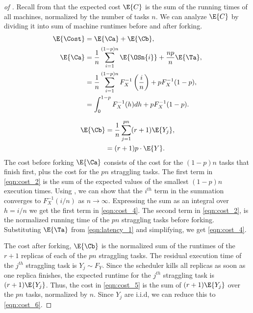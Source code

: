 \begin{proof}[of ]
Recall from  that the expected cost $\E{C}$ is the sum of the running times of all machines, normalized by the number of tasks $n$. We can analyze $\E{C}$ by dividing it into sum of machine runtimes before and after forking.
\begin{align}
    \E{\Cost} &= \E{\Ca} + \E{\Cb} \label{eqn:cost_1} , \\
\E{\Ca} &= \frac{1}{n} \sum_{i=1}^{(1-p) n} \E{\OSn{i}} + \frac{n p}{n} \E{ \Ta} \label{eqn:cost_2},\\
   &= \frac{1}{n} \sum_{i=1}^{(1-p) n} F_X^{-1} \left(\frac{i}{n} \right) + p F_X^{-1}(1-p) \label{eqn:cost_3},\\
   &= \int_{0}^{1-p} F_X^{-1}(h) dh + p F_X^{-1}(1-p) \label{eqn:cost_4}.
\end{align}

\begin{align}
 \E{\Cb} 
  &= \frac{1}{n}  \sum_{j=1}^{pn} (r+1) \E{Y_j} \label{eqn:cost_5},\\
  &= (r+1)  p \cdot \E{Y} . \label{eqn:cost_6}
\end{align}
The cost before forking $\E{\Ca}$ consists of the cost for the $(1-p)n$ tasks that finish first, plus the cost
for the $pn$ straggling tasks. The first term in \eqref{eqn:cost_2} is the sum of the expected values of the
smallest $(1-p)n$ execution times. Using , we can show that the $i^{th}$ term in
the summation converges to $F_X^{-1}(i/n)$ as $n \rightarrow \infty$. Expressing the sum as an integral over $h
= i/n$ we get the first term in \eqref{eqn:cost_4}. The second term in \eqref{eqn:cost_2}, is the normalized
running time of the $pn$ straggling tasks before forking. Substituting $\E{\Ta}$ from \eqref{eqn:latency_1} and
simplifying, we get \eqref{eqn:cost_4}. 

The cost after forking, $\E{\Cb}$ is the normalized sum of the runtimes of the $r+1$ replicas of each of the
$pn$ straggling tasks. The residual execution time of the $j^{th}$ straggling task is $Y_j \sim F_Y$. Since the
scheduler kills all replicas as soon as one replica finishes, the expected runtime for the $j^{th}$ straggling
task is $(r+1) \E{Y_j}$. Thus, the cost in \eqref{eqn:cost_5} is the sum of $(r+1) \E{Y_j}$ over the $pn$ tasks,
normalized by $n$. Since $Y_j$ are i.i.d, we can reduce this to \eqref{eqn:cost_6}.
\end{proof}


